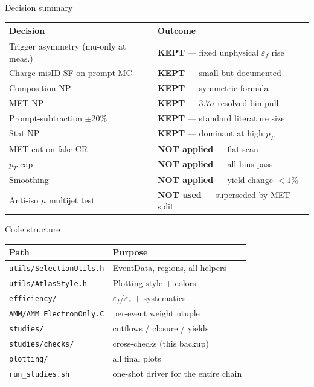 \documentclass[10pt,aspectratio=169]{beamer}
\newcommand{\fname}[1]{\texttt{\tiny #1}}
\begin{document}
\begin{frame}{Decision summary}
  \footnotesize
  \begin{tabular}{ll}
    \toprule
    Decision & Outcome \\
    \midrule
    Trigger asymmetry (mu-only at meas.) & \textbf{KEPT} — fixed unphysical $\varepsilon_f$ rise \\
    Charge-misID SF on prompt MC          & \textbf{KEPT} — small but documented \\
    Composition NP                        & \textbf{KEPT} — symmetric formula \\
    MET NP                                & \textbf{KEPT} — $3.7\sigma$ resolved bin pull \\
    Prompt-subtraction $\pm 20\%$         & \textbf{KEPT} — standard literature size \\
    Stat NP                               & \textbf{KEPT} — dominant at high $p_T$ \\
    \midrule
    MET cut on fake CR                    & \textbf{NOT applied} — flat scan \\
    $p_T$ cap                             & \textbf{NOT applied} — all bins pass \\
    Smoothing                             & \textbf{NOT applied} — yield change $<1\%$ \\
    Anti-iso $\mu$ multijet test          & \textbf{NOT used} — superseded by MET split \\
    \bottomrule
  \end{tabular}
\end{frame}

\begin{frame}{Code structure}
  \scriptsize
  \begin{tabular}{ll}
    \toprule
    Path & Purpose \\
    \midrule
    \fname{utils/SelectionUtils.h}    & EventData, regions, all helpers \\
    \fname{utils/AtlasStyle.h}         & Plotting style + colors \\
    \fname{efficiency/}                & $\varepsilon_f$/$\varepsilon_r$ + systematics \\
    \fname{AMM/AMM\_ElectronOnly.C}    & per-event weight ntuple \\
    \fname{studies/}                   & cutflows / closure / yields \\
    \fname{studies/checks/}            & cross-checks (this backup) \\
    \fname{plotting/}                  & all final plots \\
    \fname{run\_studies.sh}            & one-shot driver for the entire chain \\
    \bottomrule
  \end{tabular}
\end{frame}
\end{document}
